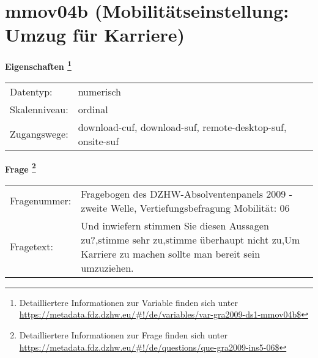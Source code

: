 
    \setcounter{footnote}{0}

    \vspace*{-1.8cm}
	\section{mmov04b (Mobilitätseinstellung: Umzug für Karriere)}
	\label{section:mmov04b}



    \vspace*{0.5cm}
    \noindent\textbf{Eigenschaften
	\footnote{Detailliertere Informationen zur Variable finden sich unter
		\url{https://metadata.fdz.dzhw.eu/\#!/de/variables/var-gra2009-ds1-mmov04b$}}}\\
	\begin{tabularx}{\hsize}{@{}lX}
	Datentyp: & numerisch \\
	Skalenniveau: & ordinal \\
	Zugangswege: &
	  download-cuf, 
	  download-suf, 
	  remote-desktop-suf, 
	  onsite-suf
 \\
    \end{tabularx}



				\vspace*{0.5cm}
                \noindent\textbf{Frage
	                \footnote{Detailliertere Informationen zur Frage finden sich unter
		              \url{https://metadata.fdz.dzhw.eu/\#!/de/questions/que-gra2009-ins5-06$}}}\\
				\begin{tabularx}{\hsize}{@{}lX}
					Fragenummer: &
					  Fragebogen des DZHW-Absolventenpanels 2009 - zweite Welle, Vertiefungsbefragung Mobilität:
					  06
 \\
					Fragetext: & Und inwiefern stimmen Sie diesen Aussagen zu?,stimme sehr zu,stimme überhaupt nicht zu,Um Karriere zu machen sollte man bereit sein umzuziehen. \\
				\end{tabularx}





